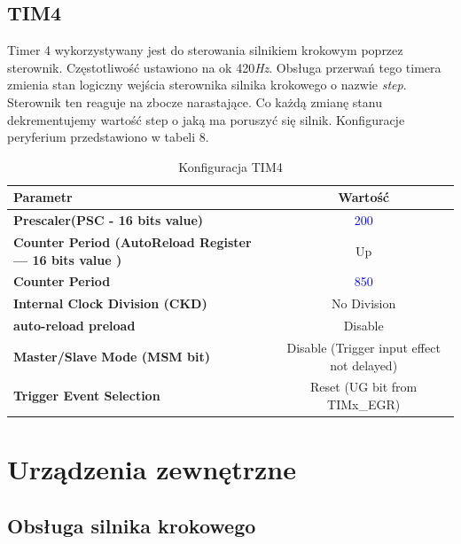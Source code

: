 \documentclass[10pt, a4paper]{article}
\begin{document}
\subsection{TIM4}
Timer 4 wykorzystywany jest do sterowania silnikiem krokowym poprzez sterownik. Częstotliwość ustawiono na ok 420\emph{Hz}. Obsługa przerwań tego timera zmienia stan logiczny wejścia sterownika silnika krokowego o nazwie \emph{step}. Sterownik ten reaguje na zbocze narastające. Co każdą zmianę stanu dekrementujemy wartość step o jaką ma poruszyć się silnik. Konfiguracje peryferium przedstawiono w tabeli 8.
 
\begin{table}[H]
    \centering
    \begin{tabular}{|l|c|} \hline
        \textbf{Parametr} & Wartość \\
        \hline
        \hline  \textbf{Prescaler(PSC - 16 bits value) }& \textcolor{blue}{200} \\
        \hline  \textbf{Counter Period (AutoReload Register --- 16 bits value )} & Up \\
        \hline  \textbf{Counter Period} & \textcolor{blue}{850} \\
        \hline  \textbf{Internal Clock Division (CKD) } & No Division\\
        \hline  \textbf{auto-reload preload} & Disable\\
        \hline  \textbf{Master/Slave Mode (MSM bit) } & Disable (Trigger input effect not delayed)
        \\
    \hline  \textbf{Trigger Event Selection} & Reset (UG bit from TIMx\_EGR)  \\
    \hline
 
    \end{tabular}
    \caption{Konfiguracja TIM4}
    \label{tab:TIM4}
\end{table}

\section{Urządzenia zewnętrzne}


\subsection{Obsługa silnika krokowego}
\end{document}
